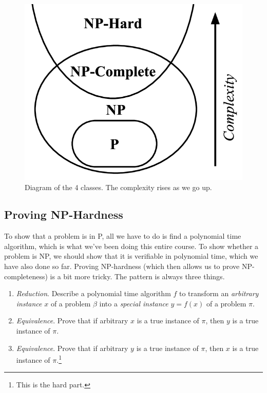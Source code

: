 \documentclass{article}
\begin{document}
    \begin{figure}[H]
      \centering 
      \includegraphics[scale=0.3]{img/class.png}
      \caption{Diagram of the 4 classes. The complexity rises as we go up. } 
      \label{fig:class}
    \end{figure}
    
  \subsection{Proving NP-Hardness}

    To show that a problem is in P, all we have to do is find a polynomial time algorithm, which is what we've been doing this entire course. To show whether a problem is NP, we should show that it is verifiable in polynomial time, which we have also done so far. Proving NP-hardness (which then allows us to prove NP-completeness) is a bit more tricky. The pattern is always three things. 
    \begin{enumerate}
      \item \textit{Reduction}. Describe a polynomial time algorithm $f$ to transform an \textit{arbitrary instance} $x$ of a problem $\beta$ into a \textit{special instance} $y = f(x)$ of a problem $\pi$. 
      \item \textit{Equivalence}. Prove that if arbitrary $x$ is a true instance of $\pi$, then $y$ is a true instance of $\pi$. 
      \item \textit{Equivalence}. Prove that if arbitrary $y$ is a true instance of $\pi$, then $x$ is a true instance of $\pi$.\footnote{This is the hard part.} 
    \end{enumerate}
\end{document}
